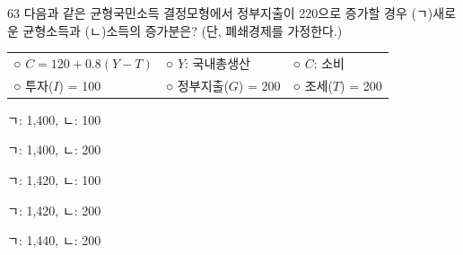 \begin{question}{63}
다음과 같은 균형국민소득 결정모형에서 정부지출이 220으로 증가할 경우 (ㄱ)새로운 균형소득과 (ㄴ)소득의 증가분은? (단, 폐쇄경제를 가정한다.)
\begin{framedtext}
\begin{tabular}{@{}lll@{}}
○ $C = 120 + 0.8(Y - T)$ & ○ $Y$: 국내총생산 & ○ $C$: 소비 \\
○ 투자($I$) = 100 & ○ 정부지출($G$) = 200 & ○ 조세($T$) = 200 \\
\end{tabular}
\end{framedtext}
\begin{choices}
  \item ㄱ: 1,400, ㄴ: 100
  \item ㄱ: 1,400, ㄴ: 200
  \item ㄱ: 1,420, ㄴ: 100
  \item ㄱ: 1,420, ㄴ: 200
  \item ㄱ: 1,440, ㄴ: 200
\end{choices}
\end{question}
